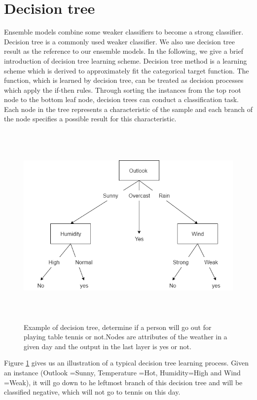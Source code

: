 \section{Decision tree}
Ensemble models combine some weaker classifiers to become a strong classifier. Decision tree is a commonly used weaker classifier. We also use decision tree result as the reference to our ensemble models. In the following,  we give a brief introduction of decision tree learning scheme.
Decision tree method is a learning scheme which is derived to approximately fit the categorical target function. The function, which is learned by decision tree, can be treated as decision processes which apply the if-then rules.
Through sorting the instances from the top root node to the bottom leaf node, decision trees can conduct a classification task. Each node in the tree represents a characteristic of the sample and each branch of the node specifies a possible result for this characteristic.
\begin{figure}[!htb]
	\begin{center}
		\includegraphics[width=5in, height=4in]{figures/dt_example.png}
	\end{center}
	\caption{Example of decision tree,  determine if a person will go out for playing table tennis or not.Nodes are attributes of the weather in a given day and the output in the last layer is yes or not. } \label{fig: dt_example}
\end{figure}    

Figure \ref{fig: dt_example} gives us an illustration of a typical decision tree learning process. Given an instance (Outlook =Sunny, Temperature =Hot,  Humidity=High and Wind =Weak),  it will go down to he leftmost branch of this decision tree and will be classified negative, which will not go to tennis on this day.  

